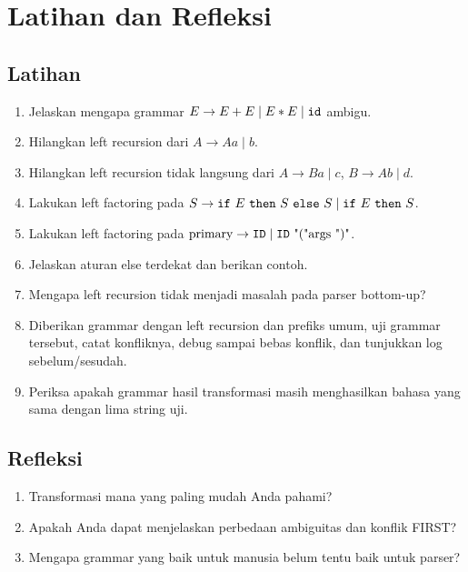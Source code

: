 \section*{Latihan dan Refleksi}

\subsection*{Latihan}
\begin{enumerate}[label=\arabic*.,leftmargin=*]
  \item Jelaskan mengapa grammar \(E \to E + E \mid E * E \mid
        \texttt{id}\) ambigu.
  \item Hilangkan left recursion dari \(A \to A a \mid b\).
  \item Hilangkan left recursion tidak langsung dari
        \(A \to B a \mid c\), \(B \to A b \mid d\).
  \item Lakukan left factoring pada
        \(S \to \texttt{if}\ E\ \texttt{then}\ S\ \texttt{else}\ S
        \mid \texttt{if}\ E\ \texttt{then}\ S\).
  \item Lakukan left factoring pada
        \(\text{primary} \to \code{ID} \mid \code{ID}\ \text{"("}
        \text{args}\ \text{")"}\).
  \item Jelaskan aturan else terdekat dan berikan contoh.
  \item Mengapa left recursion tidak menjadi masalah pada parser
        bottom-up?
  \item Diberikan grammar dengan left recursion dan prefiks umum, uji
        grammar tersebut, catat konfliknya, debug sampai bebas konflik,
        dan tunjukkan log sebelum/sesudah.
  \item Periksa apakah grammar hasil transformasi masih menghasilkan
        bahasa yang sama dengan lima string uji.
\end{enumerate}

\subsection*{Refleksi}
\begin{reflectionbox}
\begin{enumerate}[label=\arabic*.,leftmargin=*]
  \item Transformasi mana yang paling mudah Anda pahami?
  \item Apakah Anda dapat menjelaskan perbedaan ambiguitas dan
        konflik FIRST?
  \item Mengapa grammar yang baik untuk manusia belum tentu baik untuk
        parser?
\end{enumerate}
\end{reflectionbox}
